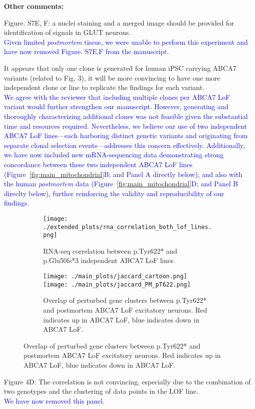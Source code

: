 \textbf{Other comments:}

Figure. S7E, F: a nuclei staining and a merged image should be provided for identification of signals in GLUT neurons.\\
\textcolor{blue}{Given limited \textit{postmortem} tissue, we were unable to perform this experiment and have now removed Figure. S7E,F from the manuscript.}

It appears that only one clone is generated for human iPSC carrying ABCA7 variants (related to Fig. 3), it will be more convincing to have one more independent clone or line to replicate the findings for each variant.\\
\textcolor{blue}{We agree with the reviewer that including multiple clones per ABCA7 LoF variant would further strengthen our manuscript. However, generating and thoroughly characterizing additional clones was not feasible given the substantial time and resources required. Nevertheless, we believe our use of two independent ABCA7 LoF lines—each harboring distinct genetic variants and originating from separate clonal selection events—addresses this concern effectively. Additionally, we have now included new mRNA-sequencing data demonstrating strong concordance between these two independent ABCA7 LoF lines (Figure~\ref{fig:main_mitochondrial}B; and Panel A directly below), and also with the human \textit{postmortem} data (Figure~\ref{fig:main_mitochondrial}D; and Panel B direclty below), further reinforcing the validity and reproducibility of our findings.}

\begin{figure}[H] 
	\centering
	\begin{subfigure}[t]{.4\textwidth}
		\caption{RNA-seq correlation between p.Tyr622* and p.Glu50fs*3 independent ABCA7 LoF lines.}
        \vspace{2cm}
		\texttt{[image: ./extended\_plots/rna\_correlation\_both\_lof\_lines.png]}        
	\end{subfigure} 
    \hspace{1cm}
    \begin{subfigure}[t]{0.4\textwidth}
		\caption{Overlap of perturbed gene clusters between p.Tyr622* and postmortem ABCA7 LoF excitatory neurons. Red indicates up in ABCA7 LoF, blue indicates down in ABCA7 LoF.}
        \vspace{1cm}
        \centering
        \texttt{[image: ./main\_plots/jaccard\_cartoon.png]}        
        \texttt{[image: ./main\_plots/jaccard\_PM\_pT622.png]}        
    \end{subfigure}  
\end{figure}

Figure 4D: The correlation is not convincing, especially due to the combination of two genotypes and the clustering of data points in the LOF line.\\
\textcolor{blue}{We have now removed this panel.}

